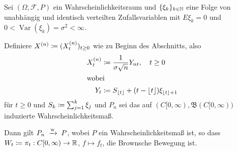 \documentclass[a4paper,twoside,DIV15,BCOR12mm]{scrbook}
\newcommand{\cF}{\mathcal F}
\newcommand{\borel}{{\mathfrak B}}
\begin{document}
\begin{satz}
\label{satz:14.7}
Sei $(\Omega, \cF, P)$ ein Wahrscheinlichkeitsraum  und $\{\xi_k\}_{k\in\mathbb{N}}$ eine Folge von unabhängig und identisch verteilten Zufallsvariablen mit $E\xi_k=0$ und $0<\operatorname{Var}(\xi_k) = \sigma^2<\infty$.

Definiere $X^{(n)} \da (X_t^{(n)})_{t\ge 0}$ wie zu Beginn des Abschnitts, also
\begin{align*}
X_t^{(n)} &\da \frac1{\sigma \sqrt n} Y_{nt},\quad t\ge 0\\
\intertext{wobei}
Y_t &\da S_{\lfloor t\rfloor} + (t-\lfloor t\rfloor)\xi_{\lfloor t\rfloor+1}
\end{align*}
für $t\ge 0$ und $S_k \da \sum_{j=1}^k \xi_j$ und $P_n$ sei das auf $(C[0,\infty),\borel(C[0,\infty))$ induzierte Wahrscheinlichkeitsmaß.

Dann gilt $P_n\tonach{w}P$, wobei $P$ ein Wahrscheinlichkeitsmaß ist, so dass $W_t\da \pi_t : C[0,\infty) \to \MdR$, $f\mapsto f_t$, die Brownsche Bewegung ist.
\end{satz}
\end{document}
